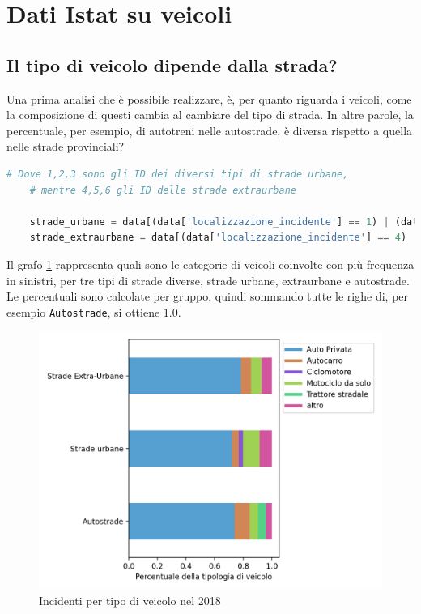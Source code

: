 \documentclass[a4paper,12pt]{report}
\newcommand{\columnstyle}[1]{\texttt{#1}}
\begin{document}
\section{Dati Istat su veicoli}

\subsection{Il tipo di veicolo dipende dalla strada?}

Una prima analisi che è possibile realizzare, è, per quanto riguarda i veicoli, come 
la composizione di questi cambia al cambiare del tipo di strada. 
In altre parole, la percentuale, per esempio, di autotreni nelle autostrade, è diversa rispetto 
a quella nelle strade provinciali? 

\begin{lstlisting}[language=Python]
    # Dove 1,2,3 sono gli ID dei diversi tipi di strade urbane, 
    # mentre 4,5,6 gli ID delle strade extraurbane

    strade_urbane = data[(data['localizzazione_incidente'] == 1) | (data['localizzazione_incidente'] == 2) | (data['localizzazione_incidente'] == 3)]['tipo_veicolo_a']
    strade_extraurbane = data[(data['localizzazione_incidente'] == 4) | (data['localizzazione_incidente'] == 5) | (data['localizzazione_incidente'] == 6)]['tipo_veicolo_a']
\end{lstlisting}

Il grafo \ref{fig:differenza-strade} rappresenta quali sono le categorie di veicoli 
coinvolte con più frequenza in sinistri, per tre tipi di strade diverse, strade urbane, 
extraurbane e autostrade. 
Le percentuali sono calcolate per gruppo, quindi sommando 
tutte le righe di, per esempio \columnstyle{Autostrade}, si ottiene $1.0$.

\begin{figure}
    \includegraphics[width=\linewidth]{../src/incidenti/incidenti_senza_coords/tipo_veicoli/differenza_strade.png}
    \caption{Incidenti per tipo di veicolo nel 2018}
    \label{fig:differenza-strade}
\end{figure}
\end{document}

